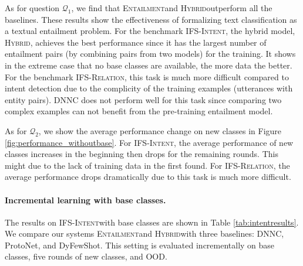 \documentclass[11pt]{article}
\newcommand{\modelname}{\textsc{Entailment}}
\newcommand{\hybrid}{\textsc{Hybrid}}
\newcommand{\intentdata}{\textsc{IFS-Intent}}
\newcommand{\relationdata}{\textsc{IFS-Relation}}
\begin{document}

As for question $\mathcal{Q}_1$, we find that \modelname\enspace and \hybrid\enspace outperform all the baselines. These results show the effectiveness of formalizing text classification as a textual entailment problem.
For the benchmark \intentdata\enspace, the hybrid model, \hybrid, achieves the best performance since it has the largest number of entailment pairs (by combining pairs from two models) for the training. It shows in the extreme case that no base classes are available, the more data the better. For the benchmark \relationdata, this task is much more difficult compared to intent detection due to the complicity of the training examples (utterances with entity pairs). DNNC does not perform well for this task since comparing two complex examples can not benefit from the pre-training entailment model.

As for $\mathcal{Q}_2$, we show the average performance change on new classes in Figure \ref{fig:performance_withoutbase}. For \intentdata, the average performance of new classes increases in the beginning then drops for the remaining rounds. This might due to the lack of training data in the first found. For \relationdata, the average performance drops dramatically due to this task is much more difficult.


\paragraph{Incremental learning with base classes.}
The results on \intentdata\enspace with base classes are shown in Table \ref{tab:intentresults}. 
We compare our systems \modelname\enspace and \hybrid\enspace with three baselines: DNNC, ProtoNet, and DyFewShot. This setting is evaluated incrementally on base classes, five rounds of new classes, and OOD.
\end{document}
